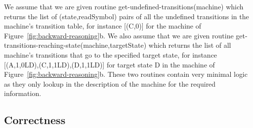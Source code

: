 We assume that we are given routine {\sc get-undefined-transitions}(machine) which returns the list of (state,readSymbol) pairs of all the undefined transitions in the machine's transition table, for instance [(\textcolor{colorC}{C},0)] for the machine of Figure~\ref{fig:backward-reasoning}b. We also assume that we are given routine {\sc get-transitions-reaching-state}(machine,targetState) which returns the list of all machine's transitions that go to the specified target state, for instance [(\textcolor{colorA}{A},1,0LD),(\textcolor{colorC}{C},1,1LD),(D,1,1LD)] for target state D in the machine of Figure~\ref{fig:backward-reasoning}b. These two routines contain very minimal logic as they only lookup in the description of the machine for the required information.

\subsection{Correctness}

